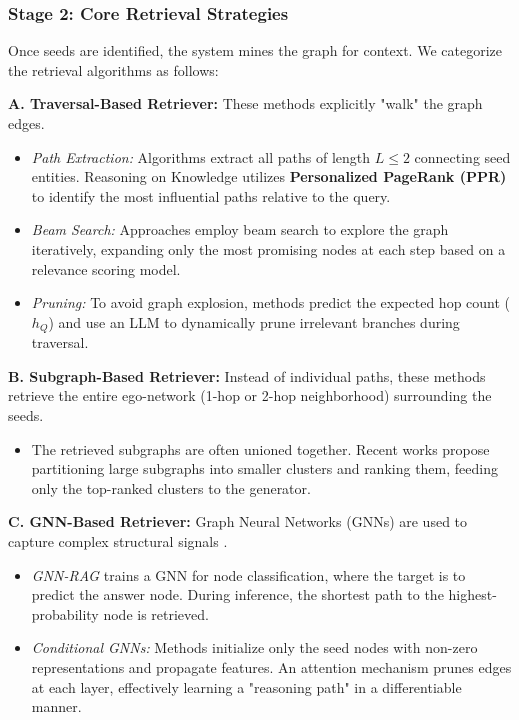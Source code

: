 \documentclass[a4paper, 12pt]{extreport}
\begin{document}
\subsubsection{Stage 2: Core Retrieval Strategies}
Once seeds are identified, the system mines the graph for context. We categorize the retrieval algorithms as follows:

\textbf{A. Traversal-Based Retriever:}
These methods explicitly "walk" the graph edges.
\begin{itemize}
    \item[] \textit{Path Extraction:} Algorithms extract all paths of length $L \le 2$ connecting seed entities. Reasoning on Knowledge utilizes \textbf{Personalized PageRank (PPR)} to identify the most influential paths relative to the query.
    \item[] \textit{Beam Search:} Approaches employ beam search to explore the graph iteratively, expanding only the most promising nodes at each step based on a relevance scoring model.
    \item[] \textit{Pruning:} To avoid graph explosion, methods predict the expected hop count ($h_Q$) and use an LLM to dynamically prune irrelevant branches during traversal.
\end{itemize}

\textbf{B. Subgraph-Based Retriever:}
Instead of individual paths, these methods retrieve the entire ego-network (1-hop or 2-hop neighborhood) surrounding the seeds.
\begin{itemize}
    \item[] The retrieved subgraphs are often unioned together. Recent works propose partitioning large subgraphs into smaller clusters and ranking them, feeding only the top-ranked clusters to the generator.
\end{itemize}

\textbf{C. GNN-Based Retriever:}
Graph Neural Networks (GNNs) are used to capture complex structural signals \cite{scarselli2008gnn}.
\begin{itemize}
    \item[] \textit{GNN-RAG} trains a GNN for node classification, where the target is to predict the answer node. During inference, the shortest path to the highest-probability node is retrieved.
    \item[] \textit{Conditional GNNs:} Methods initialize only the seed nodes with non-zero representations and propagate features. An attention mechanism prunes edges at each layer, effectively learning a "reasoning path" in a differentiable manner.
\end{itemize}
\end{document}
